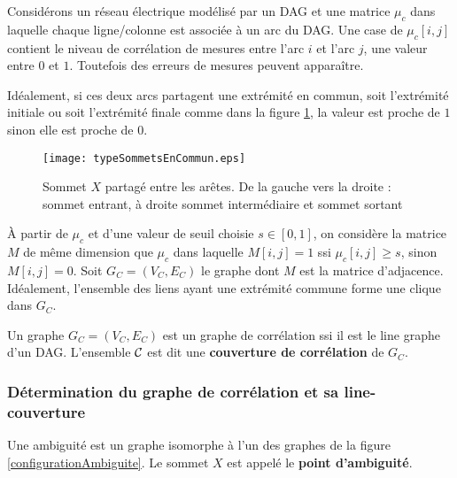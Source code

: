 Consid\'erons un r\'eseau \'electrique mod\'elis\'e  par un DAG et une matrice $\mu_c$ dans laquelle chaque ligne/colonne est associ\'ee \`a un arc du DAG.
Une case de $\mu_c[i,j]$ contient le niveau de corr\'elation de mesures entre l'arc $i$ et l'arc $j$, une valeur entre $0$ et $1$. Toutefois des erreurs de mesures peuvent appara\^itre.
\newline

Id\'ealement, si ces deux arcs partagent une extr\'emit\'e en commun, soit l'extr\'emit\'e initiale ou soit l'extr\'emit\'e finale comme dans la figure \ref{typeSommetsEnCommun}, la valeur est proche de $1$ sinon elle est proche de $0$.

	\begin{centering} %
	\begin{figure}[htb!]\vspace{-0.5em}
	\texttt{[image: typeSommetsEnCommun.eps]}\vspace{-0.5em}
	\caption{ Sommet $X$ partag\'e entre les ar\^etes. De la gauche vers la droite : sommet entrant, \`a droite sommet interm\'ediaire et sommet sortant }\vspace{-0.5em}
	\label{typeSommetsEnCommun}
	\end{figure}
	\end{centering}
	
\`A partir de $\mu_c$ et d'une valeur de seuil choisie $s \in [0,1]$, on consid\`ere la matrice $M$ de m\^eme dimension que $\mu_{c}$ dans laquelle 
$M[i,j] = 1$ ssi $\mu_c[i,j] \ge s$, sinon $M[i,j] = 0$. 
\newline
Soit $G_C = (V_C,E_C)$ le graphe dont $M$ est la matrice d'adjacence.
Id\'ealement, l'ensemble des liens ayant une extr\'emit\'e commune forme une clique dans $G_C$.

\begin{definition}
	Un graphe $G_C = (V_C, E_C)$ est un graphe de corr\'elation ssi il est le line graphe d'un DAG.
	L'ensemble $\cal C$ est dit une {\bf couverture de corr\'elation} de $G_C$.
\end{definition}

\subsubsection{D\'etermination du graphe de corr\'elation et sa line-couverture}
	\begin{definition}
	Une ambiguit\'e est un graphe isomorphe \`a l'un des graphes de la figure \ref{configurationAmbiguite}. Le sommet $X$ est appel\'e le {\bf point d'ambiguit\'e}.
	\end{definition}
	
